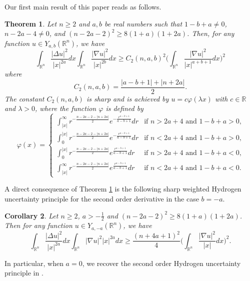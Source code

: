 \documentclass[a4paper,12pt]{article}
\theoremstyle{plain}
\newtheorem{theorem}{Theorem}[section]
\newtheorem{corollary}[theorem]{Corollary}
\theoremstyle{definition}
\theoremstyle{remark}
\def\R{\mathbb R}%
\def\lt{\left}%
\def\rt{\right}%
\def\irn{\int_{\R^n}}
\numberwithin{equation}{section}
\begin{document}
Our first main result of this paper reads as follows.

\begin{theorem}\label{MainII}
Let $n\geq 2$ and $a, b$ be real numbers such that $1-b+a \not=0$, $n-2a -4\not=0$, and $(n-2a -2)^2 \geq 8(1+a)(1+2a)$. Then, for any function $u\in Y_{a,b}(\R^n)$, we have
\begin{equation}\label{eq:2ndCKNnew}
\irn \frac{|\Delta u|^2}{|x|^{2a}} dx \irn \frac{|\nabla u|^2}{|x|^{2b}} dx \geq C_2(n,a,b)^2 \Big(\irn \frac{|\nabla u|^2}{|x|^{a+b +1}} dx\Big)^2
\end{equation}
where
\[
C_2(n,a,b) = \frac{|a-b +1| + |n+2a|}2.
\]
The constant $C_2(n,a,b)$ is sharp and is achieved by $u = c \varphi(\lambda x)$ with $c\in \R$ and $\lambda >0$, where the function $\varphi$ is defined by
\begin{equation}\label{eq:extremavphi}
\varphi(x) =
\begin{cases}
\int_{|x|}^\infty r^{ -\frac{ n - 2a -2 - |n+2a|}2} e^{-\frac{r^{a-b+1}}{a-b+1}} dr&\mbox{if $n > 2a +4$ and $1-b+a >0$,}\\
\int_0^{|x|} r^{ -\frac{ n - 2a -2 - |n+2a|}2} e^{-\frac{r^{a-b+1}}{a-b+1}} dr&\mbox{if $n < 2a +4$ and $1-b+a >0$,}\\
\int_0^{|x|} r^{ -\frac{ n - 2a -2 - |n+2a|}2} e^{\frac{r^{a-b+1}}{a-b+1}} dr&\mbox{if $n > 2a +4$ and $1-b+a <0$,}\\
\int_{|x|}^\infty r^{ -\frac{ n - 2a -2 - |n+2a|}2} e^{\frac{r^{a-b+1}}{a-b+1}} dr&\mbox{if $n< 2a +4$ and $1-b+a <0$}.
\end{cases}
\end{equation}
\end{theorem}
A direct consequence of Theorem \ref{MainII} is the following sharp weighted Hydrogen uncertainty principle for the second order derivative in the case $b=-a$. 
\begin{corollary}
	Let $n\geq 2$, $a > -\frac 12$ and $(n-2a -2)^2 \geq 8(1+a)(1+2a)$. Then for any function $u\in Y_{a,-a}(\R^n)$, we have
\[
\irn \frac{|\Delta u|^2}{|x|^{2a}} dx \irn |\nabla u|^2 |x|^{2a} dx \geq  { \frac{(n+4a+1)^2}4} \Big(\irn \frac{|\nabla u|^2}{|x|} dx\Big)^2.
\]
\end{corollary}
In particular, when  $a=0$, we recover the second order Hydrogen uncertainty principle in \cite{CFL22}.
\end{document}
